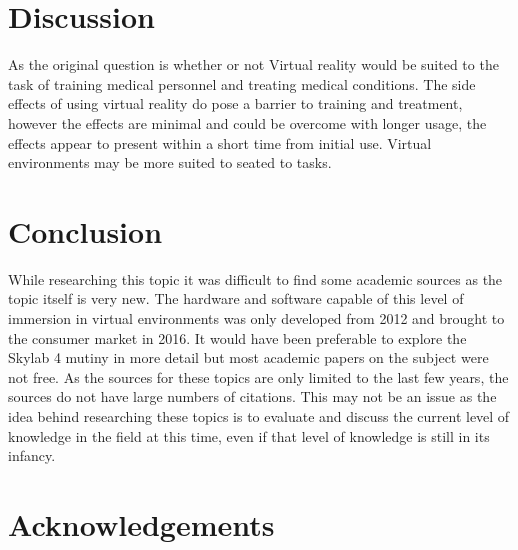 \documentclass[10pt,journal,compsoc]{IEEEtran}
\begin{document}
\section{Discussion }

As the original question is whether or not Virtual reality would be suited to the task of training medical personnel and treating medical conditions. The side effects of using virtual reality do pose a barrier to training and treatment, however the effects are minimal and could be overcome with longer usage, the effects appear to present within a short time from initial use. Virtual environments may be more suited to seated to tasks.

	\section{Conclusion}
	While researching this topic it was difficult to find some academic sources as the topic itself is very new. The hardware and software capable of this level of immersion in virtual environments was only developed from 2012 and brought to the consumer market in 2016. It would have been preferable to explore the Skylab 4 mutiny in more detail but most academic papers on the subject were not free. As the sources for these topics are only limited to the last few years, the sources do not have large numbers of citations. This may not be an issue as the idea behind researching these topics is to evaluate and discuss the current level of knowledge in the field at this time, even if that level of knowledge is still in its infancy. 

	\section{Acknowledgements}
\end{document}
